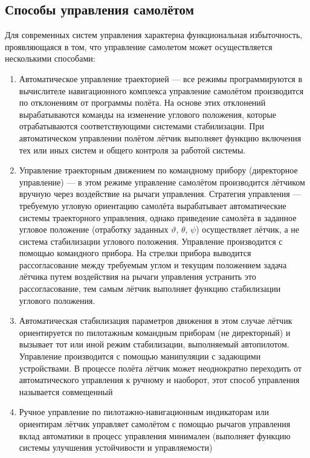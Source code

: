 \documentclass{article}
\begin{document}
\subsection{Способы управления самолётом}
Для современных систем управления характерна функциональная избыточность,
проявляющаяся в том, что управление самолетом может осуществляется несколькими
способами:
\begin{enumerate}
    \item Автоматическое управление траекторией --- все режимы программируются
        в вычислителе навигационного комплекса управление самолётом
        производится по отклонениям от программы полёта. На основе этих
        отклонений вырабатываются команды на изменение углового положения,
        которые отрабатываются соответствующими системами стабилизации. При
        автоматическом управлении полётом лётчик выполняет функцию включения
        тех или иных систем и общего контроля за работой системы.
    \item Управление траекторным движением по командному прибору (директорное
        управление) --- в этом режиме управление самолётом производится
        лётчиком вручную через воздействие на рычаги управления. Стратегия
        управления --- требуемую угловую ориентацию самолёта вырабатывает
        автоматические системы траекторного управления, однако приведение
        самолёта в заданное угловое положение (отработку заданных $\vartheta$,
        $\theta$, $\psi$) осуществляет лётчик, а не система стабилизации
        углового положения. Управление производится с помощью командного
        прибора. На стрелки прибора выводится рассогласование между требуемым
        углом и текущим положением задача лётчика путем воздействия на рычаги
        управления устранить это рассогласование, тем самым лётчик выполняет
        функцию стабилизации углового положения.
    \item Автоматическая стабилизация параметров движения в этом случае лётчик
        ориентируется по пилотажным командным приборам (не директорный) и
        вызывает тот или иной режим стабилизации, выполняемый автопилотом.
        Управление производится с помощью манипуляции с задающими устройствами.
        В процессе полёта лётчик может неоднократно переходить от
        автоматического управления к ручному и наоборот, этот способ управления
        называется совмещенный
    \item Ручное управление по пилотажно-навигационным индикаторам или
        ориентирам лётчик управляет самолётом с помощью рычагов управления
        вклад автоматики в процесс управления минимален (выполняет функцию
        системы улучшения устойчивости и управляемости)
\end{enumerate}
\end{document}
